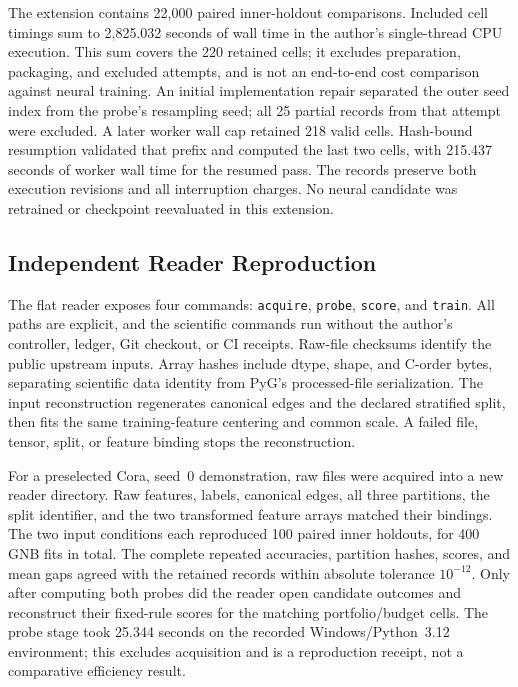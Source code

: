 The extension contains 22,000 paired inner-holdout comparisons. Included cell timings sum to 2,825.032 seconds of wall time in the author's single-thread CPU execution. This sum covers the 220 retained cells; it excludes preparation, packaging, and excluded attempts, and is not an end-to-end cost comparison against neural training. An initial implementation repair separated the outer seed index from the probe's resampling seed; all 25 partial records from that attempt were excluded. A later worker wall cap retained 218 valid cells. Hash-bound resumption validated that prefix and computed the last two cells, with 215.437 seconds of worker wall time for the resumed pass. The records preserve both execution revisions and all interruption charges. No neural candidate was retrained or checkpoint reevaluated in this extension.

\subsection{Independent Reader Reproduction}
\label{sec:reader_reproduction}

The flat reader exposes four commands: \texttt{acquire}, \texttt{probe}, \texttt{score}, and \texttt{train}. All paths are explicit, and the scientific commands run without the author's controller, ledger, Git checkout, or CI receipts. Raw-file checksums identify the public upstream inputs. Array hashes include dtype, shape, and C-order bytes, separating scientific data identity from PyG's processed-file serialization. The input reconstruction regenerates canonical edges and the declared stratified split, then fits the same training-feature centering and common scale. A failed file, tensor, split, or feature binding stops the reconstruction.

For a preselected Cora, seed~0 demonstration, raw files were acquired into a new reader directory. Raw features, labels, canonical edges, all three partitions, the split identifier, and the two transformed feature arrays matched their bindings. The two input conditions each reproduced 100 paired inner holdouts, for 400 GNB fits in total. The complete repeated accuracies, partition hashes, scores, and mean gaps agreed with the retained records within absolute tolerance $10^{-12}$. Only after computing both probes did the reader open candidate outcomes and reconstruct their fixed-rule scores for the matching portfolio/budget cells. The probe stage took 25.344 seconds on the recorded Windows/Python~3.12 environment; this excludes acquisition and is a reproduction receipt, not a comparative efficiency result.

